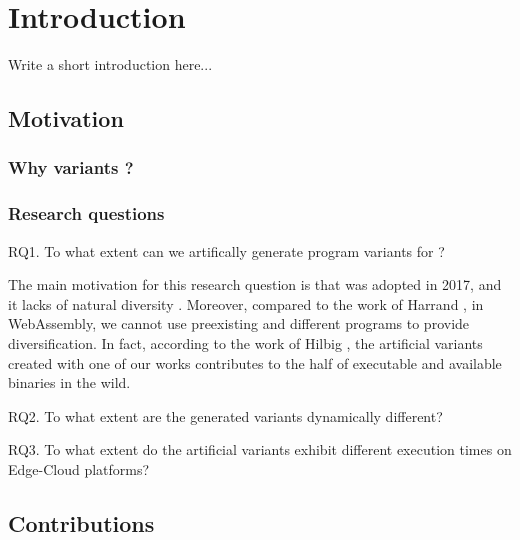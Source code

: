 \chapter{Introduction}

\newcommand{\rqone}{RQ1. To what extent can we artifically generate program variants for \wasm?}

\newcommand{\rqtwo}{RQ2. To what extent are the generated variants dynamically different?}
\newcommand{\rqthree}{RQ3. To what extent do the artificial variants exhibit different execution times on Edge-Cloud platforms?}

Write a short introduction here...



\section{Motivation}

\subsection{Why variants ?}

\subsection{Research questions}
\label{intro:definition:rq}

\rqone

The main motivation for this research question is that \wasm was adopted in 2017, and it lacks of natural diversity \citationneeded. Moreover, compared to the work of Harrand \etal \citationneeded, in WebAssembly, we cannot use preexisting and different programs to provide diversification. In fact, according to the work of Hilbig \etal \citationneeded, the artificial variants created with one of our works contributes to the half of executable and available \wasm binaries in the wild. 

\rqtwo

\rqthree

\section{Contributions}